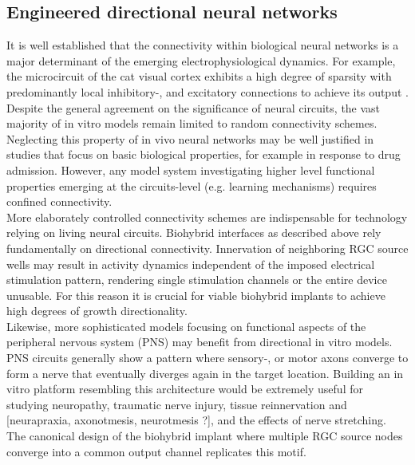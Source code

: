 \subsection{Engineered directional neural networks}
It is well established that the connectivity within biological neural networks
is a major determinant of the emerging electrophysiological dynamics. For
example, the microcircuit of the cat visual cortex exhibits a high degree of
sparsity with predominantly local inhibitory-, and excitatory connections to
achieve its output \parencite{ctxcircuit}. Despite the general agreement on the
significance of neural circuits, the vast majority of in vitro models remain
limited to random connectivity schemes. Neglecting this property of in vivo
neural networks may be well justified in studies that focus on basic biological
properties, for example in response to drug admission. However, any model system
investigating higher level functional properties emerging at the circuits-level
(e.g. learning mechanisms) requires confined connectivity. \\

More elaborately controlled connectivity schemes are indispensable for
technology relying on living neural circuits. Biohybrid interfaces as described
above rely fundamentally on directional connectivity. Innervation of neighboring
RGC source wells may result in activity dynamics independent of the imposed
electrical stimulation pattern, rendering single stimulation channels or the
entire device unusable. For this reason it is crucial for viable biohybrid
implants to achieve high degrees of growth directionality. \\
Likewise, more sophisticated models focusing on functional aspects of the
peripheral nervous system (PNS) may benefit from directional in vitro models.
PNS circuits generally show a pattern where sensory-, or motor axons converge to
form a nerve that eventually diverges again in the target location. Building an
in vitro platform resembling this architecture would be extremely useful for
studying neuropathy, traumatic nerve injury, tissue reinnervation and
[neurapraxia, axonotmesis, neurotmesis ?], and the effects of nerve stretching. 
The canonical design of the biohybrid implant where multiple RGC source nodes
converge into a common output channel replicates this motif. \\


